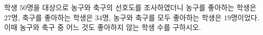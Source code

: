 학생 $50$명을 대상으로 농구와 축구의 선호도를 조사하였더니 농구를 좋아하는 학생은 $27$명, 축구를 좋아하는 학생은 $34$명, 농구와 축구를 모두 좋아하는 학생은 $19$명이었다. 이때 농구와 축구 중 어느 것도 좋아하지 않는 학생 수를 구하시오.
